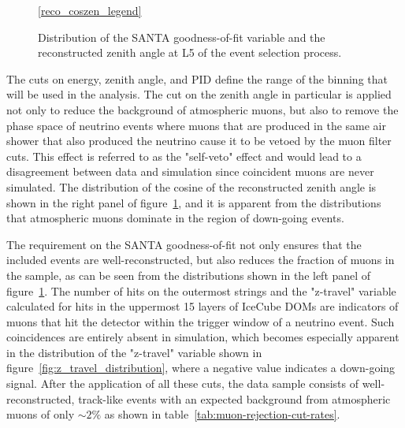 \begin{figure}
    \centering
    \ref{reco_coszen_legend}\par
    
    
    \caption{Distribution of the SANTA goodness-of-fit variable and the reconstructed zenith angle at L5 of the event selection process.}
    \label{fig:final_cut_vars_l5}
\end{figure}

The cuts on energy, zenith angle, and PID define the range of the binning that will be used in the analysis. The cut on the zenith angle in particular is applied not only to reduce the background of atmospheric muons, but also to remove the phase space of neutrino events where muons that are produced in the same air shower that also produced the neutrino cause it to be vetoed by the muon filter cuts. This effect is referred to as the "self-veto" effect and would lead to a disagreement between data and simulation since coincident muons are never simulated. The distribution of the cosine of the reconstructed zenith angle is shown in the right panel of figure~\ref{fig:final_cut_vars_l5}, and it is apparent from the distributions that atmospheric muons dominate in the region of down-going events.

The requirement on the SANTA goodness-of-fit not only ensures that the included events are well-reconstructed, but also reduces the fraction of muons in the sample, as can be seen from the distributions shown in the left panel of figure~\ref{fig:final_cut_vars_l5}. The number of hits on the outermost strings and the "z-travel" variable calculated for hits in the uppermost 15 layers of IceCube DOMs are indicators of muons that hit the detector within the trigger window of a neutrino event. Such coincidences are entirely absent in simulation, which becomes especially apparent in the distribution of the "z-travel" variable shown in figure~\ref{fig:z_travel_distribution}, where a negative value indicates a down-going signal. After the application of all these cuts, the data sample consists of well-reconstructed, track-like events with an expected background from atmospheric muons of only $\sim 2\%$ as shown in table~\ref{tab:muon-rejection-cut-rates}.

